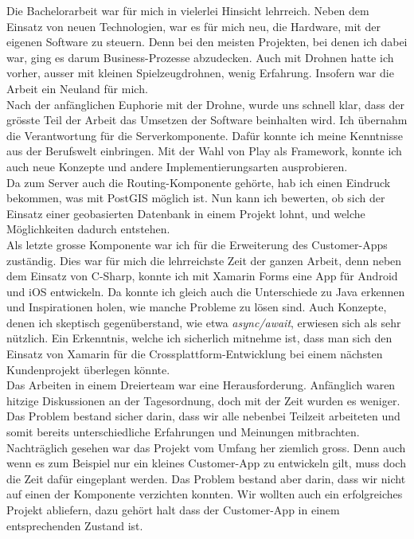 Die Bachelorarbeit war für mich in vielerlei Hinsicht lehrreich. 
Neben dem Einsatz von neuen Technologien, war es für mich neu, die Hardware, mit der eigenen Software zu steuern. Denn bei den meisten Projekten, bei denen ich dabei war, ging es darum Business-Prozesse abzudecken. Auch mit Drohnen hatte ich vorher, ausser mit kleinen Spielzeugdrohnen, wenig Erfahrung. Insofern war die Arbeit ein Neuland für mich.\\

Nach der anfänglichen Euphorie mit der Drohne, wurde uns schnell klar, dass der grösste Teil der Arbeit das Umsetzen der Software beinhalten wird.
Ich übernahm die Verantwortung für die Serverkomponente. Dafür konnte ich meine Kenntnisse aus der Berufswelt einbringen. Mit der Wahl von Play als Framework, konnte ich auch neue Konzepte und andere Implementierungsarten ausprobieren. \\

Da zum Server auch die Routing-Komponente gehörte, hab ich einen Eindruck bekommen, was mit PostGIS möglich ist. Nun kann ich bewerten, ob sich der Einsatz einer geobasierten Datenbank in einem Projekt lohnt, und welche Möglichkeiten dadurch entstehen.\\

Als letzte grosse Komponente war ich für die Erweiterung des Customer-Apps zuständig. Dies war für mich die lehrreichste Zeit der ganzen Arbeit, denn neben dem Einsatz von C-Sharp, konnte ich mit Xamarin Forms eine App für Android und iOS entwickeln. Da konnte ich gleich auch die Unterschiede zu Java erkennen und Inspirationen holen, wie manche Probleme zu lösen sind.
Auch Konzepte, denen ich skeptisch gegenüberstand, wie etwa \textit{async/await}, erwiesen sich als sehr nützlich. Ein Erkenntnis, welche ich sicherlich mitnehme ist, dass man sich den Einsatz von Xamarin für die Crossplattform-Entwicklung bei einem nächsten Kundenprojekt überlegen könnte.\\

Das Arbeiten in einem Dreierteam war eine Herausforderung. Anfänglich waren hitzige Diskussionen an der Tagesordnung, doch mit der Zeit wurden es weniger. Das Problem bestand sicher darin, dass wir alle nebenbei Teilzeit arbeiteten und somit bereits unterschiedliche Erfahrungen und Meinungen mitbrachten.  
\\

Nachträglich gesehen war das Projekt vom Umfang her ziemlich gross. Denn auch wenn es zum Beispiel nur ein kleines Customer-App zu entwickeln gilt, muss doch die Zeit dafür eingeplant werden. Das Problem bestand aber darin, dass wir nicht auf einen der Komponente verzichten konnten. Wir wollten auch ein erfolgreiches Projekt abliefern, dazu gehört halt dass der Customer-App in einem entsprechenden Zustand ist.
\\

